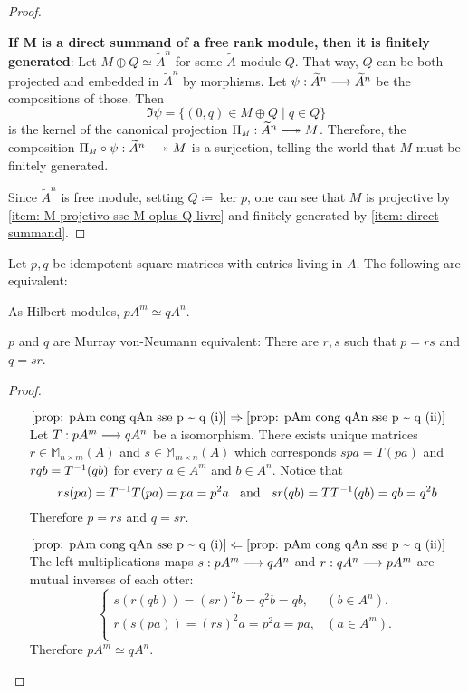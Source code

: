 \begin{proposicao}
\begin{proof}
\begin{itroman}
    \item \label{item: direct summand}\textbf{If $\boldsymbol M$ is a direct summand of a free rank module, then it is finitely generated}: Let $M\oplus Q \simeq {\widetilde{A}}^n$ for some $\widetilde A$-module $Q$. That way, $Q$ can be both projected and embedded in ${\widetilde{A}}^n$ by morphisms. Let $\psi : {\widetilde{A}}^n \longrightarrow {\widetilde{A}}^n$ be the compositions of those. Then
    \[\Im \psi = \{(0,q) \in M \oplus Q \mid q \in Q\}\]
    is the kernel of the canonical projection $\sub \Pi M : {\widetilde{A}}^n \longtwoheadrightarrow M$. Therefore, the composition $\sub \Pi M \circ \psi : {\widetilde{A}}^n \longtwoheadrightarrow M$ is a surjection, telling the world that $M$ must be finitely generated.
\end{itroman}
Since ${\widetilde{A}}^n$ is free module, setting $Q \coloneqq \ker p$, one can see that $M$ is projective by \ref{item: M projetivo sse M oplus Q livre} and finitely generated by \ref{item: direct summand}. 
\end{proof}
\end{proposicao}

\begin{lema}\label{prop: pAm cong qAn sse p ~ q}
Let $p, q$ be idempotent square matrices with entries living in $A$. The following are equivalent:
\begin{itroman}
    \item\label{prop: pAm cong qAn sse p ~ q (i)} As Hilbert modules, $pA^m \simeq q A^n$.
    \item\label{prop: pAm cong qAn sse p ~ q (ii)} $p$ and $q$ are Murray von-Neumann equivalent: There are $r,s$ such that $p=rs$ and $q=sr$.
\end{itroman}
\begin{proof}
$\left.\right.$
\begin{itemize}
    \item[$\ref{prop: pAm cong qAn sse p ~ q (i)} \Rightarrow \ref{prop: pAm cong qAn sse p ~ q (ii)}$] Let $T: pA^m \longrightarrow qA^n$ be a isomorphism. There exists unique matrices $r \in \mathbb M_{n \times m}(A)$ and $s\in \mathbb M_{m \times n}(A)$ which corresponds $spa = T(pa)$ and $rqb = {T}^{-1}(qb)$ for every $a\in A^m$ and $b\in A^n$. Notice that
    \[
    rs(pa) = {T}^{-1}T(pa) = pa = p^2a \hspace{0.25cm}\operatorname{and}\hspace{0.25cm}
    sr(qb) = T{T}^{-1}(qb) = qb = q^2b 
    \]
    Therefore $p = rs$ and $q = sr$.
    \item[$\ref{prop: pAm cong qAn sse p ~ q (i)} \Leftarrow \ref{prop: pAm cong qAn sse p ~ q (ii)}$] The left multiplications maps $s:pA^m \longrightarrow qA^n$ and $r: qA^n \longrightarrow pA^m$ are mutual inverses of each otter:
    \[
    \begin{cases}
    s(r(qb)) = (sr)^2b = q^2b = qb, & (b \in A^n).\\
    r(s(pa)) = (rs)^2a = p^2a = pa, & (a \in A^m).\\
    \end{cases}
    \]
    Therefore $ pA^m \simeq qA^n $. \qedhere
\end{itemize}
\end{proof}
\end{lema}


